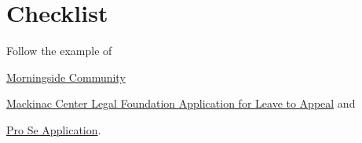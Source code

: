 \documentclass[12pt,\documentclassflag]{michiganCourtOfAppealsBrief}
\begin{document}
\section{Checklist}
\begin{todolist}
\item Follow the example of
  \begin{todolist}
  \item \href{https://www.naacpldf.org/files/about-us/2017-11-1%20MorningSide%20v.%20Sabree%20Leave%20Application%20-%20Final.pdf}{ Morningside Community}
      \item \href{https://www.mackinac.org/archives/2010/ApplicationforLeavetoAppealtoMSC.pdf}{Mackinac Center Legal Foundation Application for Leave to Appeal} and
      \item  \href{https://courts.michigan.gov/Courts/MichiganSupremeCourt/Clerks/ClerksOfficeDocuments/Pro-Per_MI-Sup-Ct_Civil-Application_05-2017_FillableForm.pdf}{Pro Se Application}.
      \end{todolist}









\end{todolist}
\end{document}
